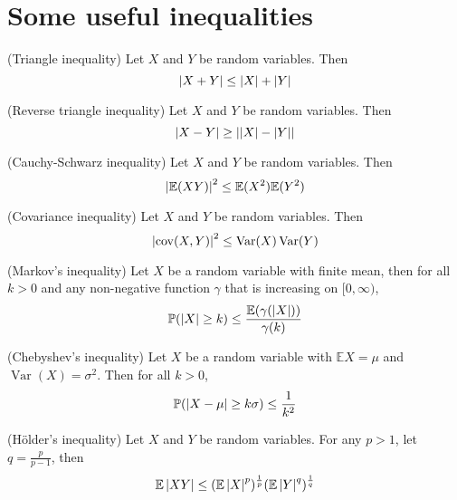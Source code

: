 \documentclass{huhtakm-template-book}
\newcommand{\prob}{\mathbb{P}}
\newcommand{\expect}{\mathbb{E}}
\DeclareMathOperator{\Var}{Var}
\DeclareMathOperator{\cov}{cov}
\begin{document}
\chapter{Some useful inequalities}
\begin{thm}(Triangle inequality)
    Let $X$ and $Y$ be random variables. Then
    \begin{equation*}
        \left|{X+Y}\right|\leq\left|{X}\right|+\left|{Y}\right|
    \end{equation*}
\end{thm}
\begin{thm}(Reverse triangle inequality)
    Let $X$ and $Y$ be random variables. Then
    \begin{equation*}
        \left|{X-Y}\right|\geq\left|{\left|{X}\right|-\left|{Y}\right|}\right|
    \end{equation*}
\end{thm}
\begin{thm}(Cauchy-Schwarz inequality)
    Let $X$ and $Y$ be random variables. Then
    \begin{equation*}
        \abs{\expect(XY)}^{2}\leq\expect(X^{2})\expect(Y^{2})
    \end{equation*}
\end{thm}
\begin{thm}(Covariance inequality)
    Let $X$ and $Y$ be random variables. Then
    \begin{equation*}
        \abs{\cov(X,Y)}^{2}\leq\Var(X)\Var(Y)
    \end{equation*}
\end{thm}
\begin{thm}(Markov's inequality)
    Let $X$ be a random variable with finite mean, then for all $k>0$ and any non-negative function $\gamma$ that is increasing on $[0,\infty)$,
    \begin{equation*}
        \prob(\abs{X}\geq k)\leq\frac{\expect(\gamma(\abs{X}))}{\gamma(k)}
    \end{equation*}
\end{thm}
\begin{thm}(Chebyshev's inequality)
    Let $X$ be a random variable with $\expect X=\mu$ and $\Var(X)=\sigma^{2}$. Then for all $k>0$,
    \begin{equation*}
        \prob(\abs{X-\mu}\geq k\sigma)\leq\frac{1}{k^{2}}
    \end{equation*}
\end{thm}
\begin{thm}(H\"older's inequality)
    Let $X$ and $Y$ be random variables. For any $p>1$, let $q=\frac{p}{p-1}$, then
    \begin{equation*}
        \expect\abs{XY}\leq(\expect\abs{X}^{p})^{\frac{1}{p}}(\expect\abs{Y}^{q})^{\frac{1}{q}}
    \end{equation*}
\end{thm}
\end{document}
